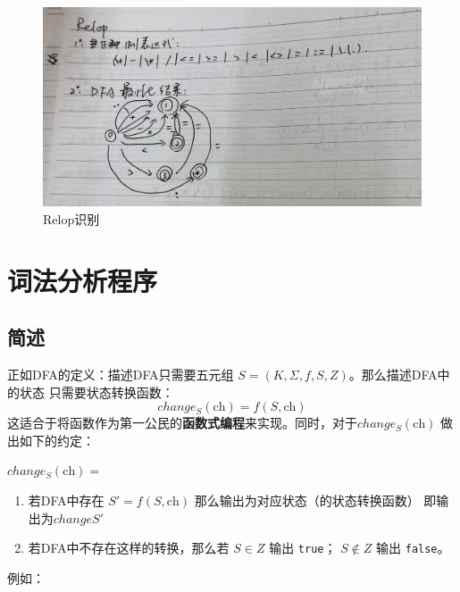 \documentclass[lang=cn]{elegantpaper}
\begin{document}
\begin{figure}
	\centering
	\includegraphics[width=0.7\linewidth]{img/IMG_3157}
	\caption{Relop识别}
	\label{fig:img3157}
\end{figure}


\section{词法分析程序}


\subsection{简述}

正如DFA的定义：描述DFA只需要五元组 $S = (K, \Sigma, f, S, Z)$。那么描述DFA中的状态
只需要状态转换函数：
$$
change_{S}(\mathrm{ch}) = f( S, \mathrm{ch})
$$
这适合于将函数作为第一公民的{\textbf{函数式编程}}来实现。同时，对于$change_S(\mathrm{ch})$
做出如下的约定：

\noindent $change_{S} (\mathrm {ch}) = $
\begin{enumerate}
    \item 若DFA中存在 $S' = f (S, \mathrm{ch})$ 那么输出为对应状态（的状态转换函数）
          即输出为$change{S'}$
    \item 若DFA中不存在这样的转换，那么若
        \subitem $S \in Z$ 输出 \lstinline|true|；
        \subitem $S \notin Z$ 输出 \lstinline|false|。
\end{enumerate}

例如：
\end{document}
